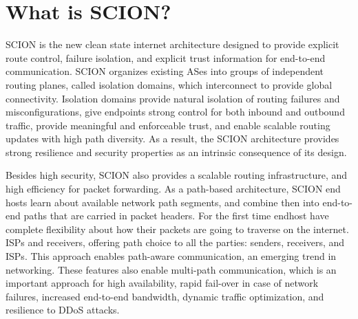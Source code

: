 \section{What is SCION?} \label{sec:about_scion}
SCION is the new clean state internet architecture designed to provide explicit route control, failure isolation, and explicit trust information for end-to-end communication. SCION organizes existing ASes into groups of independent routing planes, called isolation domains, which interconnect to provide global connectivity. Isolation domains provide natural isolation of routing failures and misconfigurations, give endpoints strong control for both inbound and outbound traffic, provide meaningful and enforceable trust, and enable scalable routing updates with high path diversity. As a result, the SCION architecture provides strong resilience and security properties as an intrinsic consequence of its design.

Besides high security, SCION also provides a scalable routing infrastructure, and high efficiency for packet forwarding. As a path-based architecture, SCION end hosts learn about available network path segments, and combine then into end-to-end paths that are carried in packet headers. For the first time endhost have complete flexibility about how their packets are going to traverse on the internet. ISPs and receivers, offering path choice to all the parties: senders, receivers, and ISPs. This approach enables path-aware communication, an emerging trend in networking. These features also enable multi-path communication, which is an important approach for high availability, rapid fail-over in case of network failures, increased end-to-end bandwidth, dynamic traffic optimization, and resilience to DDoS attacks.



